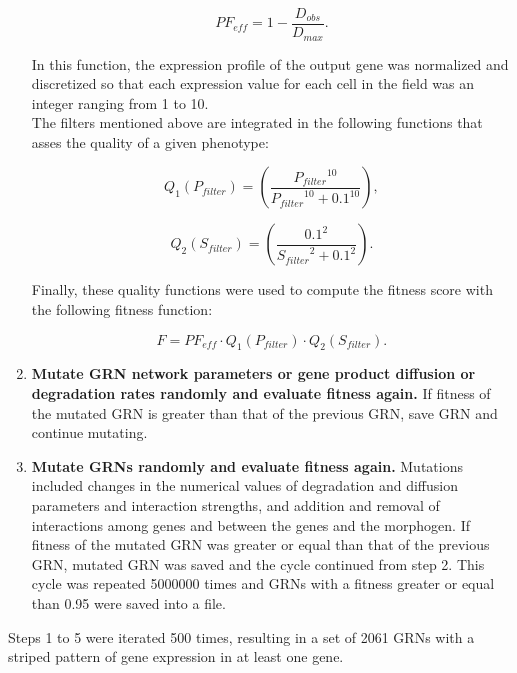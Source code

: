 \documentclass[10pt,letterpaper]{article}
\begin{document}
\begin{enumerate}
 \begin{equation}
  \mathit{PF}_{eff} = 1 - \frac{D_{obs}}{D_{max}}.
 \end{equation}
 
 In this function, the expression profile of the output gene was normalized and
 discretized so that each expression value for each cell in the field was an
 integer ranging from 1 to 10.\\
 
 The filters mentioned above are integrated in the following functions that 
 asses the quality of a given phenotype:
 
 \begin{equation}
  Q_1(P_{filter}) = \left( \frac{ {P_{filter}}^{10} }{ {P_{filter}}^{10} + 
  0.1^{10} } \right),
 \end{equation}
 
 \begin{equation}
  Q_2(S_{filter}) = \left( \frac{ 0.1^2 }{ {S_{filter}}^2 + 0.1^2 } \right).
 \end{equation}

 Finally, these quality functions were used to compute the fitness score with
 the following fitness function:
 
 \begin{equation}
  F = \mathit{PF_{eff}} \cdot Q_1(P_{filter}) \cdot Q_2(S_{filter}).
 \end{equation}

 \item{\bf Mutate GRN network parameters or gene product diffusion or 
degradation rates randomly and evaluate fitness again.} If fitness of the 
mutated GRN is greater than that of the previous GRN, save GRN and continue 
mutating.
 
 \item {\bf Mutate GRNs randomly and evaluate fitness again.} Mutations 
included changes in the  numerical values of degradation and diffusion 
parameters and interaction strengths, and addition and removal of interactions 
among genes and between the genes and the morphogen. If fitness of the mutated 
GRN was greater or equal than that of the previous GRN, mutated GRN was saved 
and the cycle continued from step 2. This cycle was repeated 5000000 times and 
GRNs with a fitness greater or equal than 0.95 were saved into a file.

\end{enumerate}

Steps 1 to 5 were iterated 500 times, resulting in a set of 2061 GRNs with a 
striped pattern of gene expression in at least one gene.
\end{document}
